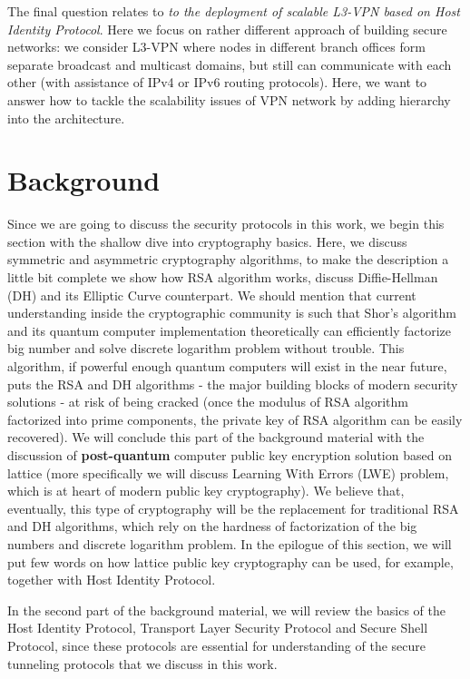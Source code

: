 The final question relates to {\it to the deployment of scalable L3-VPN 
based on Host Identity Protocol}. Here we focus on rather different approach of building 
secure networks: we consider L3-VPN where nodes in different branch offices form separate 
broadcast and multicast domains, but still can communicate with each other (with assistance of IPv4 or IPv6 
routing protocols). Here, we want to answer how to tackle the scalability issues of 
VPN network by adding hierarchy into the architecture.


\chapter{Background}

Since we are going to discuss the security protocols in this work, we begin 
this section with the shallow dive into cryptography basics. Here, we discuss 
symmetric and asymmetric cryptography algorithms, to make the description a 
little bit complete we show how RSA algorithm works, discuss  
Diffie-Hellman (DH) and its Elliptic Curve counterpart. We should mention that current 
understanding inside the cryptographic community is such that Shor’s algorithm and 
its quantum computer implementation theoretically 
can efficiently factorize big number and solve discrete logarithm problem without trouble. 
This algorithm, if powerful enough quantum computers will exist in the near future, 
puts the RSA and DH algorithms - the major building blocks of modern security 
solutions - at risk of being cracked (once the modulus of RSA algorithm factorized 
into prime components, the private key of RSA 
algorithm can be easily recovered). We will conclude this part of the background 
material with the discussion of {\bf post-quantum} computer public key encryption 
solution based on lattice (more specifically we will discuss Learning With Errors 
(LWE) problem, which is at heart of modern public key cryptography). 
We believe that, eventually, this type of cryptography will be 
the replacement for traditional RSA and DH algorithms, which rely on the hardness 
of factorization of the big numbers and discrete logarithm problem. In the epilogue of this 
section, we will put few words on how lattice public key cryptography can be used, 
for example, together with Host Identity Protocol.

In the second part of the background material, we will review the basics of the Host 
Identity Protocol, Transport Layer Security Protocol and Secure Shell Protocol, since 
these protocols are essential for understanding of the secure tunneling protocols that we
discuss in this work.

